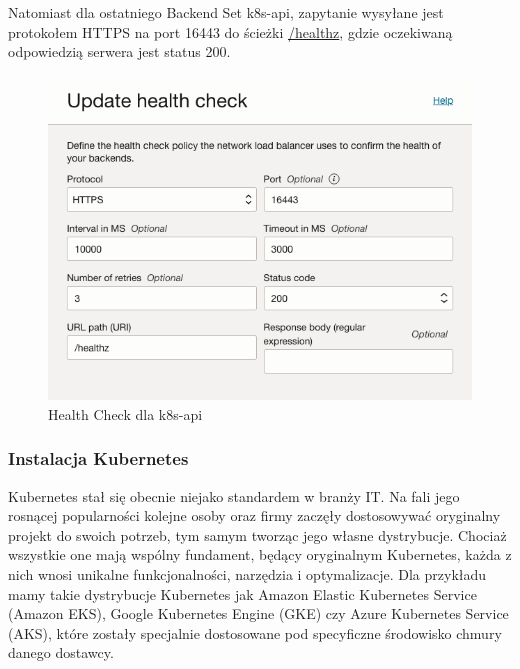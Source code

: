 Natomiast dla ostatniego Backend Set k8s-api, zapytanie wysyłane jest protokołem HTTPS na port 16443 do ścieżki \url{/healthz}, gdzie oczekiwaną odpowiedzią serwera jest status 200.
\begin{figure}[H]
    \centering
    \includegraphics[width=\textwidth]{img/oci-network-load-balancer-k8s-api-health-check}
    \caption{Health Check dla k8s-api}
    \label{fig:oci-network-load-balancer-k8s-api-health-check}
\end{figure}

\subsubsection{Instalacja Kubernetes}

Kubernetes stał się obecnie niejako standardem w branży IT\@.
Na fali jego rosnącej popularności kolejne osoby oraz firmy zaczęły dostosowywać oryginalny projekt do swoich potrzeb, tym samym tworząc jego własne dystrybucje.
Chociaż wszystkie one mają wspólny fundament, będący oryginalnym Kubernetes, każda z nich wnosi unikalne funkcjonalności, narzędzia i optymalizacje.
Dla przykładu mamy takie dystrybucje Kubernetes jak Amazon Elastic Kubernetes Service (Amazon EKS), Google Kubernetes Engine (GKE) czy Azure Kubernetes Service (AKS), które zostały specjalnie dostosowane pod specyficzne środowisko chmury danego dostawcy.

